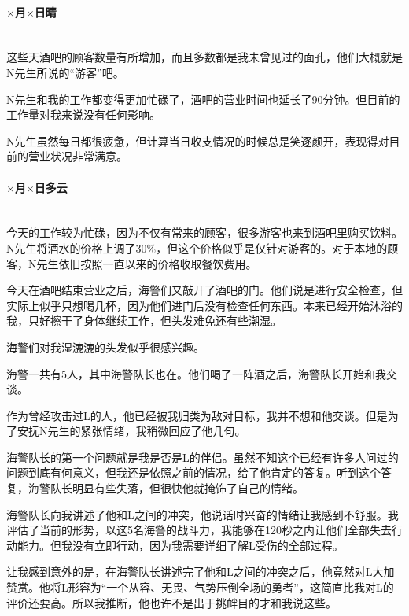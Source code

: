 \paragraph*{$\times$月$\times$日\quad 晴}\mbox{}\\

这些天酒吧的顾客数量有所增加，而且多数都是我未曾见过的面孔，他们大概就是N先生所说的“游客”吧。

N先生和我的工作都变得更加忙碌了，酒吧的营业时间也延长了90分钟。但目前的工作量对我来说没有任何影响。

N先生虽然每日都很疲惫，但计算当日收支情况的时候总是笑逐颜开，表现得对目前的营业状况非常满意。

\par

\paragraph*{$\times$月$\times$日\quad 多云}\mbox{}\\

今天的工作较为忙碌，因为不仅有常来的顾客，很多游客也来到酒吧里购买饮料。N先生将酒水的价格上调了30\%，但这个价格似乎是仅针对游客的。对于本地的顾客，N先生依旧按照一直以来的价格收取餐饮费用。

今天在酒吧结束营业之后，海警们又敲开了酒吧的门。他们说是进行安全检查，但实际上似乎只想喝几杯，因为他们进门后没有检查任何东西。本来已经开始沐浴的我，只好擦干了身体继续工作，但头发难免还有些潮湿。

海警们对我湿漉漉的头发似乎很感兴趣。

海警一共有5人，其中海警队长也在。他们喝了一阵酒之后，海警队长开始和我交谈。

作为曾经攻击过L的人，他已经被我归类为敌对目标，我并不想和他交谈。但是为了安抚N先生的紧张情绪，我稍微回应了他几句。

海警队长的第一个问题就是我是否是L的伴侣。虽然不知这个已经有许多人问过的问题到底有何意义，但我还是依照之前的情况，给了他肯定的答复。听到这个答复，海警队长明显有些失落，但很快他就掩饰了自己的情绪。

海警队长向我讲述了他和L之间的冲突，他说话时兴奋的情绪让我感到不舒服。我评估了当前的形势，以这5名海警的战斗力，我能够在120秒之内让他们全部失去行动能力。但我没有立即行动，因为我需要详细了解L受伤的全部过程。

让我感到意外的是，在海警队长讲述完了他和L之间的冲突之后，他竟然对L大加赞赏。他将L形容为“一个从容、无畏、气势压倒全场的勇者”，这简直比我对L的评价还要高。所以我推断，他也许不是出于挑衅目的才和我说这些。

